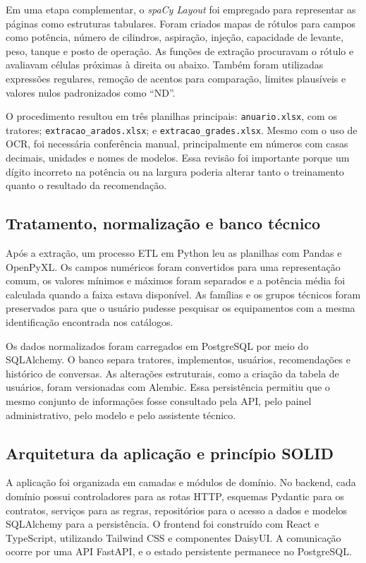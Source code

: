 \documentclass[12pt,a4paper]{article}
\begin{document}
Em uma etapa complementar, o \textit{spaCy Layout} foi empregado para representar as páginas como estruturas tabulares. Foram criados mapas de rótulos para campos como potência, número de cilindros, aspiração, injeção, capacidade de levante, peso, tanque e posto de operação. As funções de extração procuravam o rótulo e avaliavam células próximas à direita ou abaixo. Também foram utilizadas expressões regulares, remoção de acentos para comparação, limites plausíveis e valores nulos padronizados como ``ND''.

O procedimento resultou em três planilhas principais: \texttt{anuario.xlsx}, com os tratores; \texttt{extracao\_arados.xlsx}; e \texttt{extracao\_grades.xlsx}. Mesmo com o uso de OCR, foi necessária conferência manual, principalmente em números com casas decimais, unidades e nomes de modelos. Essa revisão foi importante porque um dígito incorreto na potência ou na largura poderia alterar tanto o treinamento quanto o resultado da recomendação.

\subsection{Tratamento, normalização e banco técnico}

Após a extração, um processo ETL em Python leu as planilhas com Pandas e OpenPyXL. Os campos numéricos foram convertidos para uma representação comum, os valores mínimos e máximos foram separados e a potência média foi calculada quando a faixa estava disponível. As famílias e os grupos técnicos foram preservados para que o usuário pudesse pesquisar os equipamentos com a mesma identificação encontrada nos catálogos.

Os dados normalizados foram carregados em PostgreSQL por meio do SQLAlchemy. O banco separa tratores, implementos, usuários, recomendações e histórico de conversas. As alterações estruturais, como a criação da tabela de usuários, foram versionadas com Alembic. Essa persistência permitiu que o mesmo conjunto de informações fosse consultado pela API, pelo painel administrativo, pelo modelo e pelo assistente técnico.

\subsection{Arquitetura da aplicação e princípio SOLID}

A aplicação foi organizada em camadas e módulos de domínio. No backend, cada domínio possui controladores para as rotas HTTP, esquemas Pydantic para os contratos, serviços para as regras, repositórios para o acesso a dados e modelos SQLAlchemy para a persistência. O frontend foi construído com React e TypeScript, utilizando Tailwind CSS e componentes DaisyUI. A comunicação ocorre por uma API FastAPI, e o estado persistente permanece no PostgreSQL.
\end{document}
